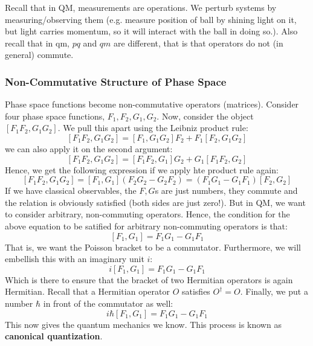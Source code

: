 \noindent Recall that in QM, measurements are operations. We perturb systems by measuring/observing them (e.g. measure position of ball by shining light on it, but light carries momentum, so it will interact with the ball in doing so.). Also recall that in qm, $pq$ and $qm$ are different, that is that operators do not (in general) commute. 

\subsubsection{Non-Commutative Structure of Phase Space}
Phase space functions become non-commutative operators (matrices).
\noindent Consider four phase space functions, $F_1, F_2, G_1, G_2$. Now, consider the object $[F_1F_2, G_1G_2]$. We pull this apart using the Leibniz product rule:
\[[F_1F_2, G_1G_2] = [F_1, G_1G_2]F_2 + F_1[F_2, G_1G_2] \]
we can also apply it on the second argument:
\[[F_1F_2, G_1G_2] = [F_1F_2, G_1]G_2 + G_1[F_1F_2, G_2]\]
Hence, we get the following expression if we apply hte product rule again:
\[[F_1F_2, G_1G_2] = [F_1, G_1](F_2G_2 - G_2F_2) = (F_1G_1 - G_1F_1)[F_2, G_2]\]
If we have classical observables, the $F, G$s are just numbers, they commute and the relation is obviously satisfied (both sides are just zero!). But in QM, we want to consider arbitrary, non-commuting operators. Hence, the condition for the above equation to be satified for arbitrary non-commuting operators is that:
\[[F_1, G_1] = F_1G_1 - G_1F_1\]
That is, we want the Poisson bracket to be a commutator. Furthermore, we will embellish this with an imaginary unit $i$:
\[i[F_1, G_1] = F_1G_1 - G_1F_1\]
Which is there to ensure that the bracket of two Hermitian operators is again Hermitian. Recall that a Hermitian operator $O$ satisfies $O^\dagger = O$. Finally, we put a number $\hbar$ in front of the commutator as well:
\[i\hbar[F_1, G_1] = F_1G_1 - G_1F_1\]
This now gives the quantum mechanics we know. This process is known as \textbf{canonical quantization}.

